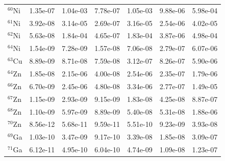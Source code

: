 \begin{table}
\begin{tabular}{l|cc|cc|cc}
$^{60}$Ni & 1.35e-07 & 1.04e-03 & 7.78e-07 & 1.05e-03 & 9.88e-06 & 5.98e-04\\
$^{61}$Ni & 3.92e-08 & 3.14e-05 & 2.69e-07 & 3.16e-05 & 2.54e-06 & 4.02e-05\\
$^{62}$Ni & 5.63e-08 & 1.84e-04 & 4.65e-07 & 1.83e-04 & 3.87e-06 & 4.98e-04\\
$^{64}$Ni & 1.54e-09 & 7.28e-09 & 1.57e-08 & 7.06e-08 & 2.79e-07 & 6.07e-06\\
$^{63}$Cu & 8.89e-09 & 8.71e-08 & 7.59e-08 & 3.12e-07 & 8.26e-07 & 5.90e-06\\
$^{64}$Zn & 1.85e-08 & 2.15e-06 & 4.00e-08 & 2.54e-06 & 2.35e-07 & 1.79e-06\\
$^{66}$Zn & 6.70e-09 & 2.45e-06 & 4.80e-08 & 3.34e-06 & 2.77e-07 & 1.49e-05\\
$^{67}$Zn & 1.15e-09 & 2.93e-09 & 9.15e-09 & 1.83e-08 & 4.25e-08 & 8.87e-07\\
$^{68}$Zn & 1.10e-09 & 5.97e-09 & 8.89e-09 & 5.40e-08 & 5.31e-08 & 1.88e-06\\
$^{70}$Zn & 8.56e-12 & 5.68e-11 & 9.59e-11 & 5.51e-10 & 9.23e-09 & 3.93e-08\\
$^{69}$Ga & 1.03e-10 & 3.47e-09 & 9.17e-10 & 3.39e-08 & 1.85e-08 & 3.09e-07\\
$^{71}$Ga & 6.12e-11 & 4.95e-10 & 6.04e-10 & 4.74e-09 & 1.09e-08 & 1.23e-07\\
\hline
\end{tabular}
\end{table}
\newpage


